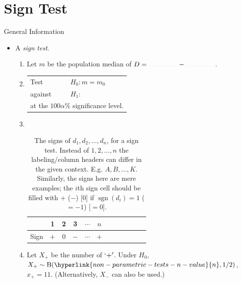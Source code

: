 \documentclass[../Notes.tex]{subfiles}
\begin{document}
\section{Sign Test}
\begin{stbox}{General Information}
  \begin{itemize}
    \item A \emph{sign test}.
    \begin{enumerate}
      \item Let \(m\) be the population median of \(D=\rule{1.5cm}{0.01mm}-\rule{1.5cm}{0.01mm}\).
      \item 
      \begin{tabular}{|ll|}
        \hline
        Test & \(H_0\colon m=m_0\)\\
        against &\(H_1\colon\) 
        \begin{enumerate*}[itemjoin={\quad}]
          \item \(m<m_0\),
          \item \(m\neq m_0\),\quad or
          \item \(m>m_0\),
        \end{enumerate*}\\
        \multicolumn{2}{|l|}{at the \(100\alpha\%\) significance level.}\\
        \hline
      \end{tabular}
      \item ~
      \begin{table}[H]
        \centering
        \begin{tabular}{|Sc|Sc|Sc|Sc|Sc|Sc|}
           & 1 & 2 & 3 & \(\cdots\) & \(n\)\\
          \hline 
          Sign & \(+\) & \(0\) & \(-\) & \(\cdots\) & \(+\)\\
          \hline
        \end{tabular}
        \caption{The signs of \(d_1,d_2,\dots,d_n\), for a sign test. Instead of \(1,2,\dots,n\) the labeling/column headers can differ in the given context. E.g. \(A,B,\dots,K\). Similarly, the signs here are mere examples; the \(i\)th sign cell should be filled with \(+\) (\(-\)) [0] if \(\operatorname{sgn}(d_i)=1\) (\(=-1\)) [\(=0\)].}
        \label{table:sign-test-working-table}
      \end{table}
      \item Let \(X_{+}\) be the number of \(`+'\). Under \(H_0\), \(X_{+}\sim\Binom(\hyperlink{non-parametric-tests-n-value}{n},1/2)\), \(x_{+}=11\). (Alternatively, \(X_{-}\) can also be used.)

\end{enumerate}
\end{itemize}
\end{stbox}
\end{document}
